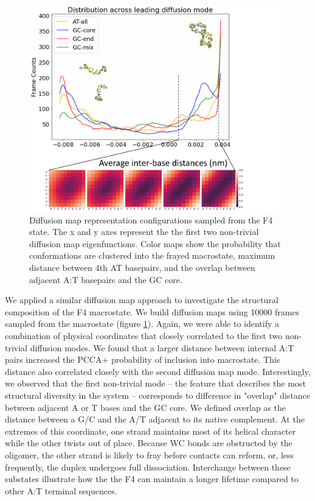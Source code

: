 \documentclass[journal=jpcbfk,manuscript=article]{achemso}
\begin{document}
\begin{figure}[ht!]
	\begin{center}
        \includegraphics[width=450, scale=1]{Fig9.pdf}
        \caption{Diffusion map representation configurations sampled from the F4 state. The x and y axes represent the the first two non-trivial diffusion map eigenfunctions. Color maps show the probability that conformations are clustered into the frayed macrostate, maximum distance between 4th AT basepairs, and the overlap between adjacent A:T basepairs and the GC core.}
        \label{fig:GC-core_dmaps}
	\end{center}
\end{figure}


We applied a similar diffusion map approach to investigate the structural composition of the F4 macrostate. We build diffusion maps using 10000 frames sampled from the macrostate (figure \ref{fig:GC-core_dmaps}). Again, we were able to identify a combination of physical coordinates that closely correlated to the first two non-trivial diffusion modes. We found that a larger distance between internal A:T pairs increased the PCCA+ probability of inclusion into macrostate. This distance also correlated closely with the second diffusion map mode. Interestingly, we observed that the first non-trivial mode -- the feature that describes the most structural diversity in the system -- corresponds to difference in "overlap" distance between adjacent A or T bases and the GC core. We defined overlap as the distance between a G/C and the A/T adjacent to its native complement. At the extremes of this coordinate, one strand maintains most of its helical character while the other twists out of place. Because WC bonds are obstructed by the oligomer, the other strand is likely to fray before contacts can reform, or, less frequently, the duplex undergoes full dissociation. Interchange between these substates illustrate how the the F4 can maintain a longer lifetime compared to other A:T terminal sequences. 
\end{document}
